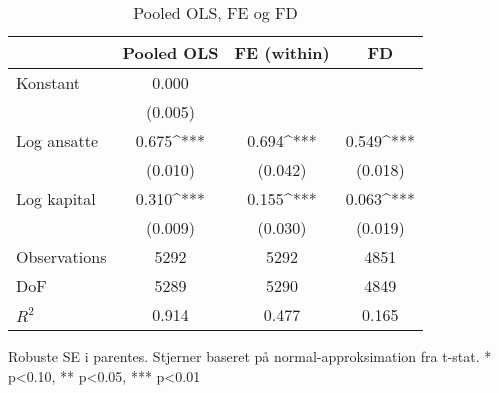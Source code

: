 \begin{table}[!htbp]
\centering
\begin{tabular}{lccc}
\toprule
 & Pooled OLS & FE (within) & FD \\
\midrule
Konstant & 0.000 &  &  \\
 & (0.005) &  &  \\
Log ansatte & 0.675^{***} & 0.694^{***} & 0.549^{***} \\
 & (0.010) & (0.042) & (0.018) \\
Log kapital & 0.310^{***} & 0.155^{***} & 0.063^{***} \\
 & (0.009) & (0.030) & (0.019) \\
\midrule
Observations & 5292 & 5292 & 4851 \\
DoF & 5289 & 5290 & 4849 \\
$R^2$ & 0.914 & 0.477 & 0.165 \\
\bottomrule
\end{tabular}
\caption{Pooled OLS, FE og FD}
\label{tab:ols_fe_fd}
\begin{flushleft}\footnotesize Robuste SE i parentes. Stjerner baseret på normal-approksimation fra t-stat. * p<0.10, ** p<0.05, *** p<0.01\end{flushleft}
\end{table}